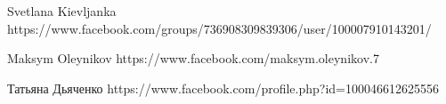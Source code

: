  
 
 
 
 
Svetlana Kievljanka
https://www.facebook.com/groups/736908309839306/user/100007910143201/

Maksym Oleynikov
https://www.facebook.com/maksym.oleynikov.7

Татьяна Дьяченко
https://www.facebook.com/profile.php?id=100046612625556
